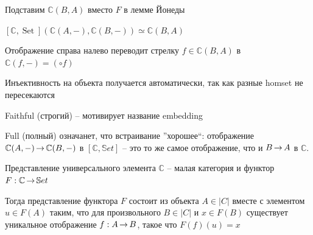 \documentclass[
  russian,
  aspectratio=169,
  xcolor={svgnames},
  hyperref={colorlinks,citecolor=DeepPink4}]{beamer}
\begin{document}
\newcommand{\boundellipse}[3]%
{(#1) ellipse (#2 and #3)
}

\begin{frame}[fragile]
\begin{minipage}{0.3\textwidth}
  \begin{figure}%
  \end{figure}
\end{minipage}
\begin{minipage}{0.65\textwidth}
Подставим $\mathbb{C}(B, A)$ вместо $F$ в лемме Йонеды
\begin{center}
$ [\mathbb{C}, \operatorname{Set}](\mathbb{C}(A,-), \mathbb{C}(B,-)) \simeq \mathbb{C}(B, A) $
\end{center}
Отображение справа налево переводит стрелку
$f\in \mathbb{C}(B, A)$ в $\mathbb{C}(f,-)=(\circ f)$
\vspace{0.5cm}

Инъективность на объекта получается автоматически, так как разные homset не пересекаются
\vspace{0.5cm}

Faithful (строгий) -- мотивирует название embedding
\vspace{0.5cm}

Full (полный) означанет, что встраивание ''хорошее``:
отображение $\mathbb{C}(A,-) \operatorname{\rightarrow} \mathbb{C}(B,-)$ в $[\mathbb{C},\mathbb{S}et]$ -- это то же самое отображение, что и $B\operatorname{\rightarrow} A$ в $\mathbb{C}$.

\end{minipage}
\end{frame}


\begin{frame}[fragile]{Представление универсального элемента}
$\mathbb{C} $ -- малая категория и функтор $F:\mathbb{C}\operatorname{\rightarrow} \mathbb{S}et$\vspace{0.5cm}

Тогда представление функтора $F$ состоит из объекта $A\in|C|$ вместе с элементом $u \in F(A)$ таким, что
для произвольного $B\in |C|$ и $x\in F(B)$ существует уникальное отображение $f:A\operatorname{\rightarrow} B$, такое что $F(f)(u)=x$
\end{frame}
\end{document}
